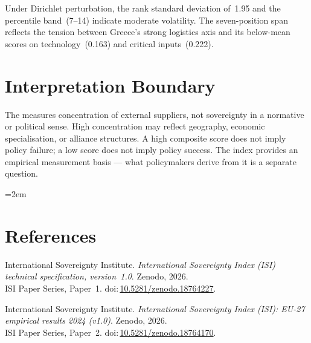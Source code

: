 \documentclass[12pt,a4paper]{article}
\begin{document}
Under Dirichlet perturbation, the rank standard deviation of~1.95 and the percentile band~(7--14) indicate moderate volatility.  The seven-position span reflects the tension between Greece's strong logistics axis and its below-mean scores on technology~(0.163) and critical inputs~(0.222).


\section{Interpretation Boundary}
\label{sec:interpretation}

The \ISI measures concentration of external suppliers, not sovereignty in a normative or political sense.  High concentration may reflect geography, economic specialisation, or alliance structures.  A high composite score does not imply policy failure; a low score does not imply policy success.  The index provides an empirical measurement basis --- what policymakers derive from it is a separate question.


\clearpage
\vspace*{1.5cm}

\begingroup\emergencystretch=2em
\section*{References}

\begin{enumerate}[label={[\arabic*]},leftmargin=2em,itemsep=6pt]
\item International Sovereignty Institute.
  \textit{International Sovereignty Index (ISI) technical specification, version~1.0}.
  Zenodo, 2026.\\ISI Paper Series, Paper~1.
  doi:\,\href{https://doi.org/10.5281/zenodo.18764227}{10.5281/zenodo.18764227}.

\item International Sovereignty Institute.
  \textit{International Sovereignty Index (ISI): EU-27 empirical results 2024 (v1.0)}.
  Zenodo, 2026.\\ISI Paper Series, Paper~2.
  doi:\,\href{https://doi.org/10.5281/zenodo.18764170}{10.5281/zenodo.18764170}.
\end{enumerate}
\endgroup
\end{document}

